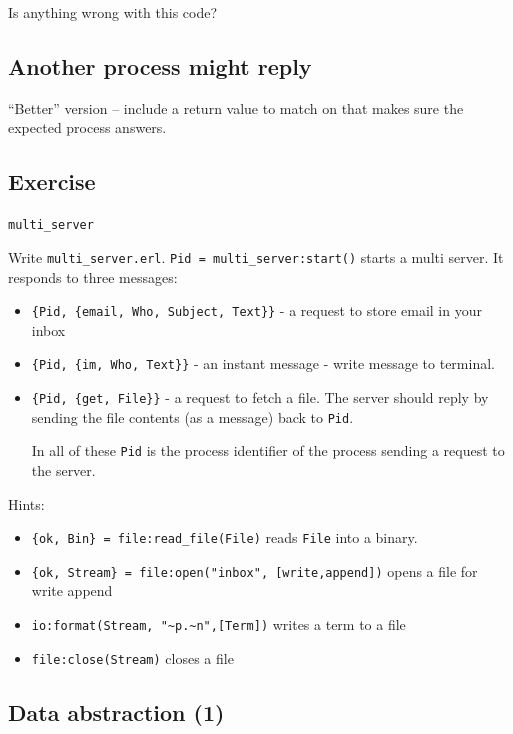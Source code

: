 \documentclass[12pt]{article}
\begin{document}
\begin{itemize}
Is anything wrong with this code?

\subsection{Another process might reply}

``Better'' version -- include a return value to match on
that makes sure the expected process answers.



\subsection{Exercise}

 \verb+multi_server+

 Write \verb+multi_server.erl+. \verb+Pid = multi_server:start()+
 starts a multi server.  It responds to three messages:

\begin{itemize}
\item \verb+{Pid, {email, Who, Subject, Text}}+ - a request to store email in your inbox
\item \verb+{Pid, {im, Who, Text}}+ - an instant message - write message to terminal.
\item \verb+{Pid, {get, File}}+ - a request to fetch a file. The server should reply
by sending the file contents (as a message) back to \verb+Pid+.

In all of these \verb+Pid+ is the process identifier of the process sending
a request to the server.
\end{itemize}

Hints:

\begin{itemize}
\item \verb+{ok, Bin} = file:read_file(File)+ reads \verb+File+ into a binary.
\item \verb+{ok, Stream} = file:open("inbox", [write,append])+ opens a file for write append
\item \verb+io:format(Stream, "~p.~n",[Term])+ writes a term to a file
\item \verb+file:close(Stream)+ closes a file
\end{itemize}


\subsection{Data abstraction (1)}


\end{itemize}
\end{document}
